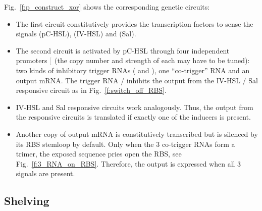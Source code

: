 \documentclass[12pt,notitlepage]{article}
\newcommand{\cbra}[1]{{\ensuremath{\color{gray}{#1}}}}
\newcommand{\promoter}[1]{{{\cbra{[}\ce{#1}\cbra{]}}}}
\begin{document}
Fig.~\ref{f:p_construct_xor}
shows the corresponding genetic circuits:
\begin{itemize}
\item
    The first circuit constitutively provides 
    the transcription factors
    to sense
    the signals  (pC-HSL),  (IV-HSL) and  (Sal).
\item
    The second circuit is activated by pC-HSL 
    through four independent promoters \promoter{Rpa^*}
    (the copy number and strength of each may have to be tuned):
    two kinds of inhibitory trigger RNAs ( and ),
    one ``co-trigger'' RNA 
    and an output mRNA. 
    The trigger RNA  / 
    inhibits the output from the IV-HSL / Sal responsive circuit
    as in Fig.~\ref{f:switch_off_RBS}.
\item
    IV-HSL and Sal responsive circuits work analogously. 
    Thus, the output from the responsive circuits is 
    translated if exactly one of the inducers is present.
\item
    Another copy of output mRNA is constitutively transcribed
    but is silenced by its RBS stemloop by default. 
    Only when the 3 co-trigger RNAs form a trimer,
    the exposed sequence  pries open the RBS,
    see Fig.~\ref{f:3_RNA_on_RBS}.
    Therefore, the output is expressed when all 3 signals are present.
\end{itemize}




\subsection{Shelving} \label{ss:shelf}
\end{document}
